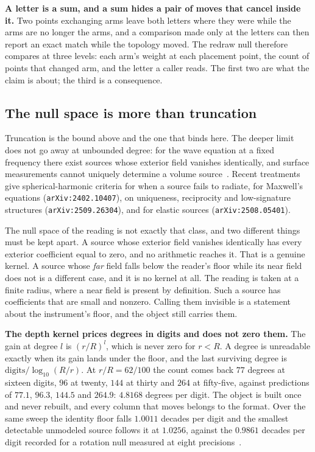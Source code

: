 \textbf{A letter is a sum, and a sum hides a pair of moves that cancel inside it.} Two points exchanging arms leave both letters where they were while the arms are no longer the arms, and a comparison made only at the letters can then report an exact match while the topology moved. The redraw null therefore compares at three levels: each arm's weight at each placement point, the count of points that changed arm, and the letter a caller reads. The first two are what the claim is about; the third is a consequence.

\subsection{The null space is more than truncation}

Truncation is the bound above and the one that binds here. The deeper limit does not go away at unbounded degree: for the wave equation at a fixed frequency there exist sources whose exterior field vanishes identically, and surface measurements cannot uniquely determine a volume source~\cite{src:Bleistein-and-Cohen-1977}. Recent treatments give spherical-harmonic criteria for when a source fails to radiate, for Maxwell's equations (\texttt{arXiv:2402.10407}), on uniqueness, reciprocity and low-signature structures (\texttt{arXiv:2509.26304}), and for elastic sources (\texttt{arXiv:2508.05401}).

The null space of the reading is not exactly that class, and two different things must be kept apart. A source whose exterior field vanishes identically has every exterior coefficient equal to zero, and no arithmetic reaches it. That is a genuine kernel. A source whose \emph{far} field falls below the reader's floor while its near field does not is a different case, and it is no kernel at all. The reading is taken at a finite radius, where a near field is present by definition. Such a source has coefficients that are small and nonzero. Calling them invisible is a statement about the instrument's floor, and the object still carries them.

\textbf{The depth kernel prices degrees in digits and does not zero them.} The gain at degree \(l\) is \((r/R)^l\), which is never zero for \(r < R\). A degree is unreadable exactly when its gain lands under the floor, and the last surviving degree is \(\text{digits} / \log_{10}(R/r)\). At \(r/R = 62/100\) the count comes back \(77\) degrees at sixteen digits, \(96\) at twenty, \(144\) at thirty and \(264\) at fifty-five, against predictions of \(77.1\), \(96.3\), \(144.5\) and \(264.9\): \(4.8168\) degrees per digit. The object is built once and never rebuilt, and every column that moves belongs to the format. Over the same sweep the identity floor falls \(1.0011\) decades per digit and the smallest detectable unmodeled source follows it at \(1.0256\), against the \(0.9861\) decades per digit recorded for a rotation null measured at eight precisions~\cite{src:Quigg-orior-workbook}.

